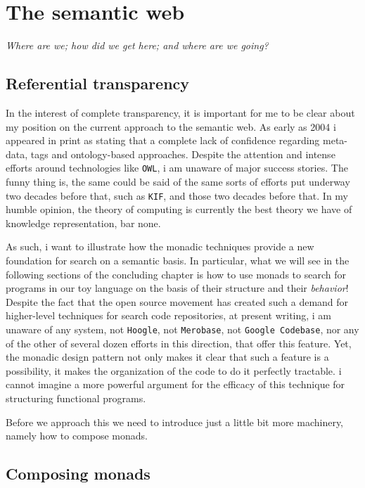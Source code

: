 

\chapter{The semantic web}
\begin{center}
{\small\em Where are we; how did we get here; and where are we going?}
\end{center}

\section{Referential transparency}

In the interest of complete transparency, it is important for me to be
clear about my position on the current approach to the semantic
web. As early as 2004 i appeared in print as stating that a complete
lack of confidence regarding meta-data, tags and ontology-based
approaches. Despite the attention and intense efforts around
technologies like \texttt{OWL}, i am unaware of major success
stories. The funny thing is, the same could be said of the same sorts
of efforts put underway two decades before that, such as \texttt{KIF},
and those two decades before that. In my humble opinion, the theory of
computing is currently the best theory we have of knowledge
representation, bar none.

As such, i want to illustrate how the monadic techniques provide a new
foundation for search on a semantic basis. In particular, what we will
see in the following sections of the concluding chapter is how to use
monads to search for programs in our toy language on the basis of
their structure and their \emph{behavior}! Despite the fact that the
open source movement has created such a demand for higher-level
techniques for search code repositories, at present writing, i am
unaware of any system, not \texttt{Hoogle}, not \texttt{Merobase}, not
\texttt{Google Codebase}, nor any of the other of several dozen
efforts in this direction, that offer this feature. Yet, the monadic
design pattern not only makes it clear that such a feature is a
possibility, it makes the organization of the code to do it perfectly
tractable. i cannot imagine a more powerful argument for the efficacy
of this technique for structuring functional programs.

Before we approach this we need to introduce just a little bit more
machinery, namely how to compose monads.


\section{Composing monads}

